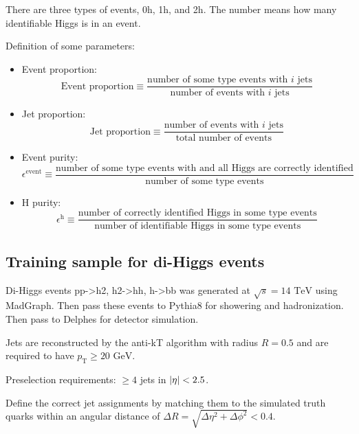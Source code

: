 \documentclass[12pt]{article}
\begin{document}
	There are three types of events, 0h, 1h, and 2h. The number means how many identifiable Higgs is in an event.

	Definition of some parameters:
	\begin{itemize}
		\item 	Event proportion:
		\begin{equation}
			\text{Event proportion} \equiv \frac{\text{number of some type events with $i$ jets}}{\text{number of events with $i$ jets}}
		\end{equation}

		\item Jet proportion:
		\begin{equation}
			\text{Jet proportion} \equiv \frac{\text{number of events with $i$ jets}}{\text{total number of events}}
		\end{equation}
		
		\item Event purity:
		\begin{equation}
			\epsilon^{\text{event}} \equiv \frac{\text{number of some type events with and all Higgs are correctly identified}}{\text{number of some type events}} 
		\end{equation}

		\item H purity:
		\begin{equation}
			\epsilon^{\text{h}} \equiv \frac{\text{number of correctly identified Higgs in some type events}}{\text{number of identifiable Higgs in some type events}} 
		\end{equation}
	\end{itemize}

	\subsection{Training sample for di-Higgs events}%
	\label{sub:training_sample_for_dihiggs_events}
		Di-Higgs events pp->h2, h2->hh, h->bb was generated at $\sqrt{s}= \text{14 TeV}$ using MadGraph. Then pass these events to Pythia8 for showering and hadronization. Then pass to Delphes for detector simulation.
	
		Jets are reconstructed by the anti-kT algorithm with radius $R=0.5$ and are required to have $p_\text{T}\ge \text{20 GeV}$.

		Preselection requirements: $\ge 4$ jets in  $\abs{\eta}<2.5$.

		Define the correct jet assignments by matching them to the simulated truth quarks within an angular distance of $\Delta R = \sqrt{\Delta\eta^2 + \Delta\phi^2}<0.4$.
\end{document}
